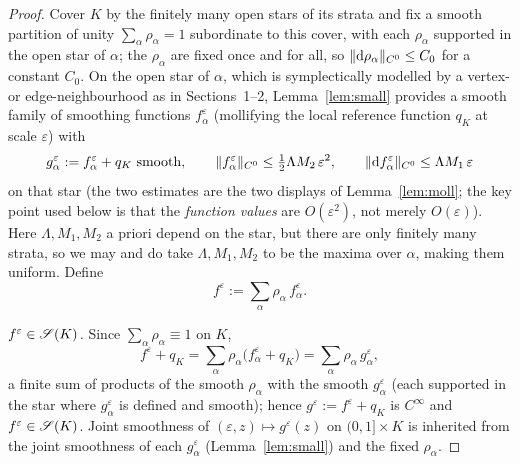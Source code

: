 \begin{proof}
Cover $K$ by the finitely many open stars of its strata and fix a smooth partition
of unity $\sum_\alpha\rho_\alpha=1$ subordinate to this cover, with each
$\rho_\alpha$ supported in the open star of $\alpha$; the $\rho_\alpha$ are fixed
once and for all, so $\|\mathrm d\rho_\alpha\|_{C^0}\le C_0$ for a constant $C_0$.
On the open star of $\alpha$, which is symplectically modelled by a vertex- or
edge-neighbourhood as in Sections~1--2, Lemma~\ref{lem:small} provides a smooth
family of smoothing functions $f_\alpha^\varepsilon$ (mollifying the local
reference function $q_K$ at scale $\varepsilon$) with
\[
g_\alpha^\varepsilon:=f_\alpha^\varepsilon+q_K\ \text{smooth},\qquad
\|f_\alpha^\varepsilon\|_{C^0}\le\tfrac12\Lambda M_2\,\varepsilon^2,\qquad
\|\qeightdd f_\alpha^\varepsilon\|_{C^0}\le\Lambda M_1\,\varepsilon
\]
on that star (the two estimates are the two displays of Lemma~\ref{lem:moll}; the
key point used below is that the \emph{function values} are $O(\varepsilon^2)$, not
merely $O(\varepsilon)$). Here $\Lambda,M_1,M_2$ a priori depend on the star, but
there are only finitely many strata, so we may and do take $\Lambda,M_1,M_2$ to be
the maxima over $\alpha$, making them uniform. Define
\[
f^\varepsilon:=\sum_\alpha\rho_\alpha\,f_\alpha^\varepsilon .
\]

\emph{$f^\varepsilon\in\mathscr S(K)$.} Since $\sum_\alpha\rho_\alpha\equiv1$ on $K$,
\[
f^\varepsilon+q_K=\sum_\alpha\rho_\alpha\bigl(f_\alpha^\varepsilon+q_K\bigr)
=\sum_\alpha\rho_\alpha\,g_\alpha^\varepsilon ,
\]
a finite sum of products of the smooth $\rho_\alpha$ with the smooth
$g_\alpha^\varepsilon$ (each supported in the star where $g_\alpha^\varepsilon$ is
defined and smooth); hence $g^\varepsilon:=f^\varepsilon+q_K$ is $C^\infty$ and
$f^\varepsilon\in\mathscr S(K)$. Joint smoothness of $(\varepsilon,z)\mapsto
g^\varepsilon(z)$ on $(0,1]\times K$ is inherited from the joint smoothness of each
$g_\alpha^\varepsilon$ (Lemma~\ref{lem:small}) and the fixed $\rho_\alpha$.


\end{proof}
